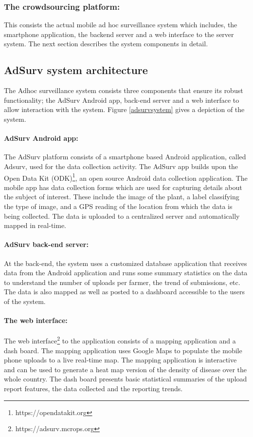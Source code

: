 \documentclass[letterpaper]{article} %
\begin{document}
\subsubsection{The crowdsourcing platform:}
This consists the actual mobile ad hoc surveillance system which includes, the smartphone application, the backend server and a web interface to the server system. The next section describes the system components in detail.

\subsection{AdSurv system architecture}
The Adhoc surveillance system consists three components that ensure its robust functionality; the AdSurv Android app, back-end server and a web interface to allow interaction with the system. Figure \ref{adsurvsystem} gives a depiction of the system.

\paragraph{AdSurv Android app:}
The AdSurv platform consists of a smartphone based Android application, called Adsurv, used for the data collection activity. The AdSurv app builds upon the Open Data Kit (ODK)\footnote{https://opendatakit.org}, an open source Android data collection application. The mobile app has data collection forms which are used for capturing details about the subject of interest. These include the image of the plant, a label classifying the type of image, and a GPS reading of the location from which the data is being collected. The data is uploaded to a centralized server and automatically mapped in real-time.

\paragraph{AdSurv back-end server:}
At the back-end, the system uses a customized database application that receives data from the Android application and runs some summary statistics on the data to understand the number of uploads per farmer, the trend of submissions, etc. The data is also mapped as well as posted to a dashboard accessible to the users of the system.

\paragraph{The web interface: }
The web interface\footnote{https://adsurv.mcrops.org} to the application consists of a mapping application and a dash board. The mapping application uses Google Maps to populate the mobile phone uploads to a live real-time map. The mapping application is interactive and can be used to generate a heat map version of the density of disease over the whole country. The dash board presents basic statistical summaries of the upload report features, the data collected and the reporting trends.
\end{document}
